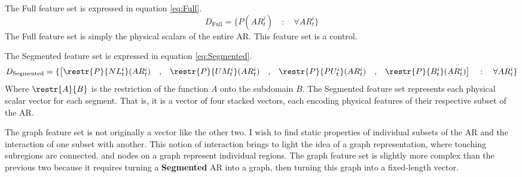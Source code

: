 The Full feature set is expressed in equation \ref{eq:Full}.
\begin{equation}
    D_{\text{Full}} = \{P(AR_t^i) \quad : \quad \forall AR_t^i\}
    \label{eq:Full}
\end{equation}
The Full feature set is simply the physical scalars of the entire AR. This feature set is a control.

The Segmented feature set is expressed in equation \ref{eq:Segmented}.
\begin{equation}
    D_{\text{Segmented}} = \{
    \begin{bmatrix}
    \restr{P}{NL_t^i}(AR_t^i) & , & \restr{P}{UM_t^i}(AR_t^i) & , & \restr{P}{PU_t^i}(AR_t^i) & , & \restr{P}{B_t^i}(AR_t^i)
    \end{bmatrix} \quad : \quad \forall AR_t^i \}
    \label{eq:Segmented}
\end{equation}
Where $\restr{A}{B}$ is the restriction of the function $A$ onto the subdomain $B$. The Segmented feature set represents each physical scalar vector for each segment. That is, it is a vector of four stacked vectors, each encoding physical features of their respective subset of the AR.

The graph feature set is not originally a vector like the other two. I wish to find static properties of individual subsets of the AR and the interaction of one subset with another. This notion of interaction brings to light the idea of a graph representation, where touching subregions are connected, and nodes on a graph represent individual regions. The graph feature set is slightly more complex than the previous two because it requires turning a \textbf{Segmented} AR into a graph, then turning this graph into a fixed-length vector.

